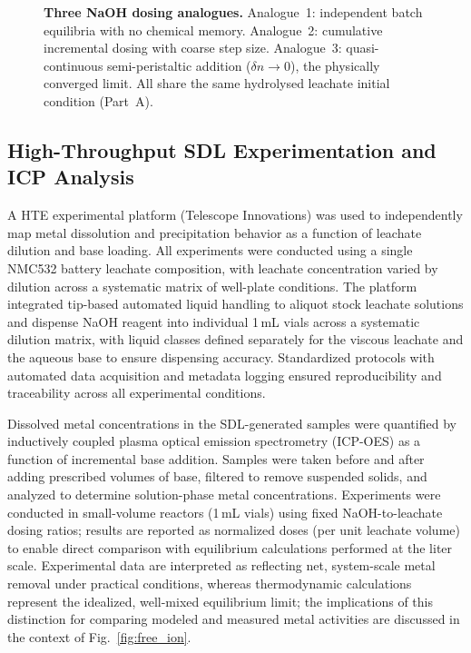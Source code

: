 \documentclass[final,2p,times]{elsarticle}
\begin{document}
\begin{figure}[!ht]
\begin{tikzpicture}


\end{tikzpicture}
\caption{\textbf{Three NaOH dosing analogues.} Analogue~1: independent batch equilibria with no chemical memory. Analogue~2: cumulative incremental dosing with coarse step size. Analogue~3: quasi-continuous semi-peristaltic addition ($\delta n\!\to\!0$), the physically converged limit. All share the same hydrolysed leachate initial condition (Part~A).}
\label{fig:analogue_schematic}
\end{figure}


\subsection{High-Throughput SDL Experimentation and ICP Analysis}\label{sec:sdl}

A HTE experimental platform (Telescope Innovations) was used to independently map metal dissolution and precipitation behavior as a function of leachate dilution and base loading. All experiments were conducted using a single NMC532 battery leachate composition, with leachate concentration varied by dilution across a systematic matrix of well-plate conditions. The platform integrated tip-based automated liquid handling to aliquot stock leachate solutions and dispense NaOH reagent into individual 1\,mL vials across a systematic dilution matrix, with liquid classes defined separately for the viscous leachate and the aqueous base to ensure dispensing accuracy. Standardized protocols with automated data acquisition and metadata logging ensured reproducibility and traceability across all experimental conditions.

Dissolved metal concentrations in the SDL-generated samples were quantified by inductively coupled plasma optical emission spectrometry (ICP-OES) as a function of incremental base addition. Samples were taken before and after adding prescribed volumes of base, filtered to remove suspended solids, and analyzed to determine solution-phase metal concentrations. Experiments were conducted in small-volume reactors (1\,mL vials) using fixed NaOH-to-leachate dosing ratios; results are reported as normalized doses (per unit leachate volume) to enable direct comparison with equilibrium calculations performed at the liter scale. Experimental data are interpreted as reflecting net, system-scale metal removal under practical conditions, whereas thermodynamic calculations represent the idealized, well-mixed equilibrium limit; the implications of this distinction for comparing modeled and measured metal activities are discussed in the context of Fig.~\ref{fig:free_ion}.
\end{document}

